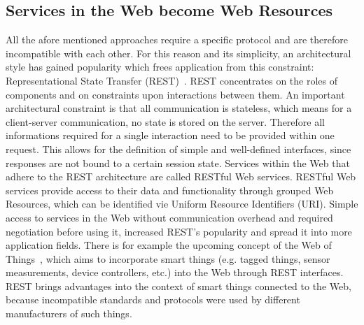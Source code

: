 \subsection{Services in the Web become Web Resources}
All the afore mentioned approaches require a specific protocol and are therefore incompatible with each other.
For this reason and its simplicity, an architectural style has gained popularity which frees application from this constraint: Representational State Transfer (\textrm{REST})~\cite{fielding2000architectural}.
\textrm{REST} concentrates on the roles of components and on constraints upon interactions between them.
An important architectural constraint is that all communication is stateless, which means for a client-server communication, no state is stored on the server.
Therefore all informations required for a single interaction need to be provided within one request.
This allows for the definition of simple and well-defined interfaces, since responses are not bound to a certain session state. 
Services within the Web that adhere to the \textrm{REST} architecture are called \textrm{RESTful} Web services.
\textrm{RESTful} Web services provide access to their data and functionality through grouped \textrm{Web Resources}, which can be identified vie Uniform Resource Identifiers (\textrm{URI}).
Simple access to services in the Web without communication overhead and required negotiation before using it, increased \textrm{REST}'s popularity and spread it into more application fields.
There is for example the upcoming concept of the \textrm{Web of Things}~\cite{Guinard2011WoT}, which aims to incorporate smart things (e.g. tagged things, sensor measurements, device controllers, etc.) into the Web through \textrm{REST} interfaces.
\textrm{REST} brings advantages into the context of smart things connected to the Web, because incompatible standards and protocols were used by different manufacturers of such things.


